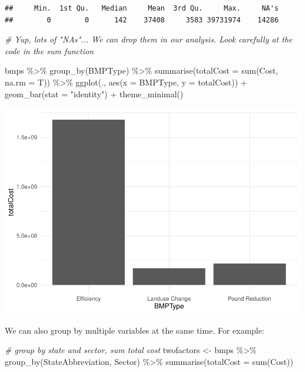 \documentclass[]{article}
\newenvironment{Shaded}{\begin{snugshade}}{\end{snugshade}}
\newcommand{\AttributeTok}[1]{\textcolor[rgb]{0.77,0.63,0.00}{#1}}
\newcommand{\CommentTok}[1]{\textcolor[rgb]{0.56,0.35,0.01}{\textit{#1}}}
\newcommand{\FunctionTok}[1]{\textcolor[rgb]{0.00,0.00,0.00}{#1}}
\newcommand{\NormalTok}[1]{#1}
\newcommand{\OtherTok}[1]{\textcolor[rgb]{0.56,0.35,0.01}{#1}}
\newcommand{\SpecialCharTok}[1]{\textcolor[rgb]{0.00,0.00,0.00}{#1}}
\newcommand{\StringTok}[1]{\textcolor[rgb]{0.31,0.60,0.02}{#1}}
\begin{document}
\begin{verbatim}
##     Min.  1st Qu.   Median     Mean  3rd Qu.     Max.     NA's 
##        0        0      142    37408     3583 39731974    14286
\end{verbatim}

\begin{Shaded}
\begin{Highlighting}[]
\CommentTok{\# Yup, lots of "NA\textquotesingle{}s"... We can drop them in our analysis. Look carefully at the code in the \textquotesingle{}sum\textquotesingle{} function}


\NormalTok{bmps }\SpecialCharTok{\%\textgreater{}\%} \FunctionTok{group\_by}\NormalTok{(BMPType) }\SpecialCharTok{\%\textgreater{}\%} \FunctionTok{summarise}\NormalTok{(}\AttributeTok{totalCost =} \FunctionTok{sum}\NormalTok{(Cost, }\AttributeTok{na.rm =}\NormalTok{ T)) }\SpecialCharTok{\%\textgreater{}\%}
  \FunctionTok{ggplot}\NormalTok{(., }\FunctionTok{aes}\NormalTok{(}\AttributeTok{x =}\NormalTok{ BMPType, }\AttributeTok{y =}\NormalTok{ totalCost)) }\SpecialCharTok{+}
  \FunctionTok{geom\_bar}\NormalTok{(}\AttributeTok{stat =} \StringTok{"identity"}\NormalTok{) }\SpecialCharTok{+}
  \FunctionTok{theme\_minimal}\NormalTok{()}
\end{Highlighting}
\end{Shaded}

\includegraphics{lab02_files/figure-latex/review-2.pdf}

We can also group by multiple variables at the same time. For example:

\begin{Shaded}
\begin{Highlighting}[]
\CommentTok{\# group by state and sector, sum total cost}
\NormalTok{twofactors }\OtherTok{\textless{}{-}}\NormalTok{ bmps }\SpecialCharTok{\%\textgreater{}\%} \FunctionTok{group\_by}\NormalTok{(StateAbbreviation, Sector) }\SpecialCharTok{\%\textgreater{}\%} \FunctionTok{summarise}\NormalTok{(}\AttributeTok{totalCost =} \FunctionTok{sum}\NormalTok{(Cost))}
\end{Highlighting}
\end{Shaded}
\end{document}
